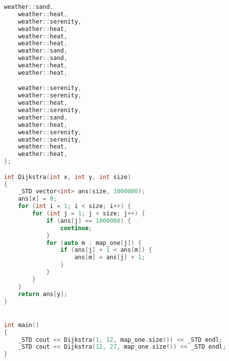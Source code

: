\documentclass{cumcmthesis}
\begin{document}
\begin{appendices}
\begin{lstlisting}[language=c++]
	weather::sand,
	weather::heat,
	weather::serenity,
	weather::heat,
	weather::heat,
	weather::heat,
	weather::sand,
	weather::sand,
	weather::heat,
	weather::heat,

	weather::serenity,
	weather::serenity,
	weather::heat,
	weather::serenity,
	weather::sand,
	weather::heat,
	weather::serenity,
	weather::serenity,
	weather::heat,
	weather::heat,
};

int Dijkstra(int x, int y, int size)
{
	_STD vector<int> ans(size, 1000000);
	ans[x] = 0;
	for (int i = 1; i < size; i++) {
		for (int j = 1; j < size; j++) {
			if (ans[j] == 1000000) {
				continue;
			}
			for (auto m : map_one[j]) {
				if (ans[j] + 1 < ans[m]) {
					ans[m] = ans[j] + 1;
				}
			}
		}
	}
	return ans[y];
}


int main()
{
	_STD cout << Dijkstra(1, 12, map_one.size()) << _STD endl;
	_STD cout << Dijkstra(12, 27, map_one.size()) << _STD endl;
}

\end{lstlisting}

\end{appendices}
\end{document}
